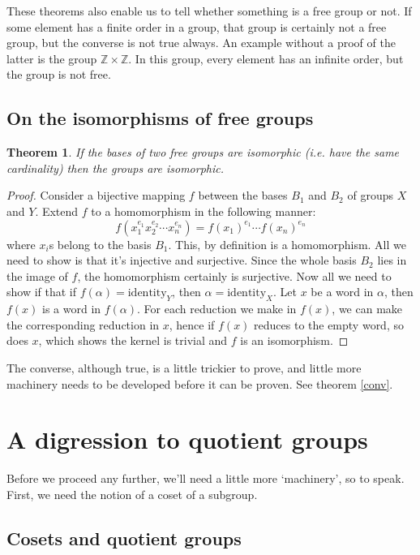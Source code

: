 \documentclass[12pt]{article}
\newtheorem{thm}{Theorem}[section]
\theoremstyle{definition}
\begin{document}
These theorems also enable us to tell whether something is a free group or not. If some element has a finite order in a group, that group is certainly not a free group, but the converse is not true always. An example without a proof of the latter is the group $\mathbb{Z} \times \mathbb{Z}$. In this group, every element has an infinite order, but the group is not free.

\subsection{On the isomorphisms of free groups\cite{lyndon}}
\begin{thm}\label{rank}
If the bases of two free groups are isomorphic (i.e. have the same cardinality) then the groups are isomorphic.
\end{thm}

\begin{proof}
Consider a bijective mapping $f$ between the bases $B_1$ and $B_2$ of groups $X$ and $Y$. Extend $f$ to a homomorphism in the following manner:
$$f(x_1^{e_1}x_2^{e_2} \cdots x_n^{e_n}) = f(x_1)^{e_1}\cdots f(x_n)^{e_n}$$
where $x_i$s belong to the basis $B_1$. This, by definition is a homomorphism. All we need to show is that it's injective and surjective. Since the whole basis $B_2$ lies in the image of $f$, the homomorphism certainly is surjective. Now all we need to show if that if $f(\alpha)=\mathrm{identity}_{Y}$, then $\alpha=\mathrm{identity}_{X}$. Let $x$ be a word in $\alpha$, then $f(x)$ is a word in $f(\alpha)$. For each reduction we make in $f(x)$, we can make the corresponding reduction in $x$, hence if $f(x)$ reduces to the empty word, so does $x$, which shows the kernel is trivial and $f$ is an isomorphism.
\end{proof}

The converse, although true, is a little trickier to prove, and little more machinery needs to be developed before it can be proven. See theorem \autoref{conv}.

\section{A digression to quotient groups}
Before we proceed any further, we'll need a little more `machinery', so to speak. First, we need the notion of a coset of a subgroup.

\subsection{Cosets and quotient groups}
\end{document}
